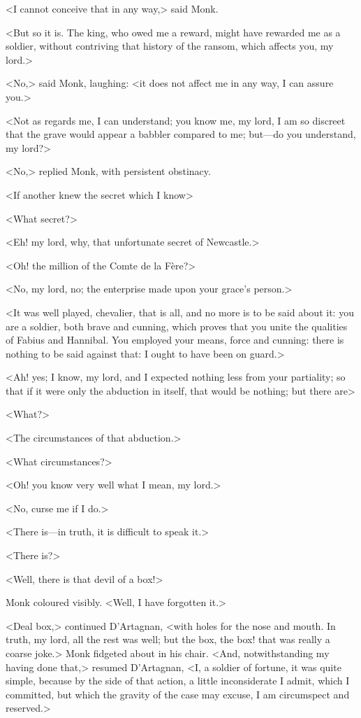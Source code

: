 <I cannot conceive that in any way,> said Monk.

<But so it is. The king, who owed me a reward, might have rewarded me as a soldier, without contriving that history of the ransom, which affects you, my lord.>

<No,> said Monk, laughing: <it does not affect me in any way, I can assure you.>

<Not as regards me, I can understand; you know me, my lord, I am so discreet that the grave would appear a babbler compared to me; but—do you understand, my lord?>

<No,> replied Monk, with persistent obstinacy.

<If another knew the secret which I know\longdash>

<What secret?>

<Eh! my lord, why, that unfortunate secret of Newcastle.>

<Oh! the million of the Comte de la Fère?>

<No, my lord, no; the enterprise made upon your grace's person.>

<It was well played, chevalier, that is all, and no more is to be said about it: you are a soldier, both brave and cunning, which proves that you unite the qualities of Fabius and Hannibal. You employed your means, force and cunning: there is nothing to be said against that: I ought to have been on guard.>

<Ah! yes; I know, my lord, and I expected nothing less from your partiality; so that if it were only the abduction in itself,  that would be nothing; but there are\longdash>

<What?>

<The circumstances of that abduction.>

<What circumstances?>

<Oh! you know very well what I mean, my lord.>

<No, curse me if I do.>

<There is—in truth, it is difficult to speak it.>

<There is?>

<Well, there is that devil of a box!>

Monk coloured visibly. <Well, I have forgotten it.>

<Deal box,> continued D'Artagnan, <with holes for the nose and mouth. In truth, my lord, all the rest was well; but the box, the box! that was really a coarse joke.> Monk fidgeted about in his chair. <And, notwithstanding my having done that,> resumed D'Artagnan, <I, a soldier of fortune, it was quite simple, because by the side of that action, a little inconsiderate I admit, which I committed, but which the gravity of the case may excuse, I am circumspect and reserved.>

